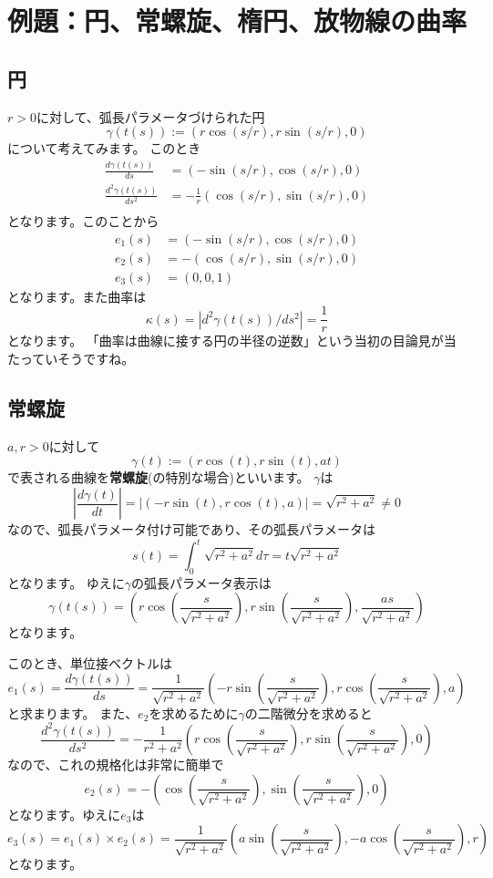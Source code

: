 \section{例題：円、常螺旋、楕円、放物線の曲率}

\subsection{円}

$r>0$に対して、弧長パラメータづけられた円
\[
  \gamma(t(s)):=(r\cos(s/r),r\sin(s/r),0)
\]
について考えてみます。
このとき
\begin{align*}
  \frac{d\gamma(t(s))}{ds}&=(-\sin(s/r),\cos(s/r),0)\\
  \frac{d^2\gamma(t(s))}{ds^2}&=-\frac1{r}(\cos(s/r),\sin(s/r),0)\\
\end{align*}
となります。このことから
\begin{align*}
  e_1(s)&=(-\sin(s/r),\cos(s/r),0)\\
  e_2(s)&=-(\cos(s/r),\sin(s/r),0)\\
  e_3(s)&=(0,0,1)
\end{align*}
となります。また曲率は
\[
  \kappa(s)=|d^2\gamma(t(s))/ds^2|=\frac1{r}
\]
となります。
「曲率は曲線に接する円の半径の逆数」という当初の目論見が当たっていそうですね。

\subsection{常螺旋}

$a,r>0$に対して
\[
  \gamma(t):=(r\cos(t),r\sin(t),at)
\]
で表される曲線を\textbf{常螺旋}(の特別な場合)といいます。
$\gamma$は
\[
  \left|\frac{d\gamma(t)}{dt}\right|=|(-r\sin(t),r\cos(t),a)|=\sqrt{r^2+a^2}\neq0
\]
なので、弧長パラメータ付け可能であり、その弧長パラメータは
\[
  s(t)=\int_0^t\sqrt{r^2+a^2}d\tau=t\sqrt{r^2+a^2}
\]
となります。
ゆえに$\gamma$の弧長パラメータ表示は
\[
  \gamma(t(s))=\left(r\cos\left(\frac{s}{\sqrt{r^2+a^2}}\right),r\sin\left(\frac{s}{\sqrt{r^2+a^2}}\right),\frac{as}{\sqrt{r^2+a^2}}\right)
\]
となります。

このとき、単位接ベクトルは
\[
  e_1(s)=\frac{d\gamma(t(s))}{ds}=\frac1{\sqrt{r^2+a^2}}\left(-r\sin\left(\frac{s}{\sqrt{r^2+a^2}}\right),r\cos\left(\frac{s}{\sqrt{r^2+a^2}}\right),a\right)
\]
と求まります。
また、$e_2$を求めるために$\gamma$の二階微分を求めると
\[
  \frac{d^2\gamma(t(s))}{ds^2}=-\frac1{r^2+a^2}\left(r\cos\left(\frac{s}{\sqrt{r^2+a^2}}\right),r\sin\left(\frac{s}{\sqrt{r^2+a^2}}\right),0\right)
\]
なので、これの規格化は非常に簡単で
\[
  e_2(s)=-\left(\cos\left(\frac{s}{\sqrt{r^2+a^2}}\right),\sin\left(\frac{s}{\sqrt{r^2+a^2}}\right),0\right)
\]
となります。ゆえに$e_3$は
\[
  e_3(s)=e_1(s)\times e_2(s)=\frac1{\sqrt{r^2+a^2}}\left(a\sin\left(\frac{s}{\sqrt{r^2+a^2}}\right),-a\cos\left(\frac{s}{\sqrt{r^2+a^2}}\right),r\right)
\]
となります。

